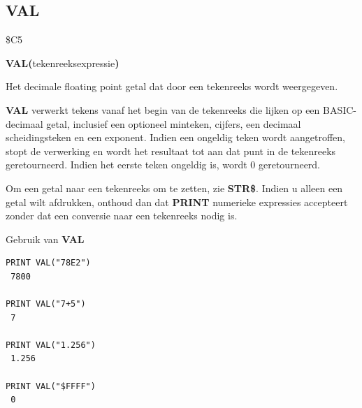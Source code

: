 \subsection{VAL}
\begin{description}[leftmargin=2cm,style=nextline]
\item [Token:]    \$C5

\item [Formaat:]   {\bf VAL(}tekenreeksexpressie{\bf)}

\item [Retourneert:]  Het decimale floating point getal dat door een tekenreeks wordt weergegeven.

\item [Opmerkingen:]  {\bf VAL} verwerkt tekens vanaf het begin van de tekenreeks die lijken op een BASIC-decimaal getal, inclusief een optioneel minteken, cijfers, een decimaal scheidingsteken en een exponent. Indien een ongeldig teken wordt aangetroffen, stopt de verwerking en wordt het resultaat tot aan dat punt in de tekenreeks geretourneerd. Indien het eerste teken ongeldig is, wordt 0 geretourneerd.

                  Om een getal naar een tekenreeks om te zetten, zie {\bf STR\$}. Indien u alleen een getal wilt afdrukken, onthoud dan dat {\bf PRINT} numerieke expressies accepteert zonder dat een conversie naar een tekenreeks nodig is.

\item [Voorbeeld:]  Gebruik van {\bf VAL}

\begin{tcolorbox}[colback=black,coltext=white]
\verbatimfont{\codefont}
\begin{verbatim}
PRINT VAL("78E2")
 7800

PRINT VAL("7+5")
 7

PRINT VAL("1.256")
 1.256

PRINT VAL("$FFFF")
 0
\end{verbatim}
\end{tcolorbox}
\end{description}


\newpage

